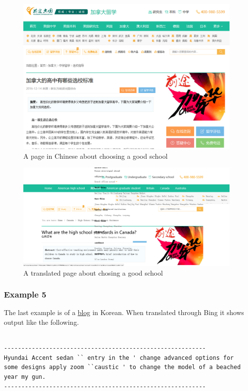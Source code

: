 \documentclass[letterpaper,12pt]{article}
\begin{document}
\begin{figure}[h]
\centering
\includegraphics[scale=0.5]{data/SchoolExampleOrig.png}
\caption{A page in Chinese about choosing a good school}
\label{chinese orig}
\end{figure}

\begin{figure}[h]
\centering
\includegraphics[scale=0.5]{data/SchoolExampleBadTranslation.png}
\caption{A translated page about chosing a good school}
\label{chinese bad}
\end{figure}

\subsubsection{Example 5}

The last example is of a  \href{http://www.hankookilbo.com/v/095b018d7b2344cb810f4c44de5779d7}{blog} in Korean. When translated through Bing it shows output like the following.


\begin{lstlisting}[breaklines]

----------------------------------------------------------
Hyundai Accent sedan `` entry in the ' change advanced options for some designs apply zoom ``caustic ' to change the model of a beached year my gun.
----------------------------------------------------------
\end{lstlisting}
\end{document}
